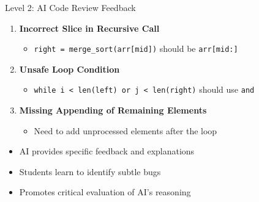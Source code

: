 \documentclass{beamer}
\begin{document}
\begin{frame}{Level 2: AI Code Review Feedback}
    \begin{tcolorbox}[colback=myred!5,colframe=myred,title=AI-Identified Issues]
        \begin{enumerate}
            \item \textbf{Incorrect Slice in Recursive Call}
                \begin{itemize}
                    \item \texttt{right = merge\_sort(arr[mid])} should be \texttt{arr[mid:]}
                \end{itemize}
                
            \item \textbf{Unsafe Loop Condition}
                \begin{itemize}
                    \item \texttt{while i < len(left) or j < len(right)} should use \texttt{and}
                \end{itemize}
                
            \item \textbf{Missing Appending of Remaining Elements}
                \begin{itemize}
                    \item Need to add unprocessed elements after the loop
                \end{itemize}
        \end{enumerate}
    \end{tcolorbox}
    
    \begin{itemize}
        \item AI provides specific feedback and explanations
        \item Students learn to identify subtle bugs
        \item Promotes critical evaluation of AI's reasoning
    \end{itemize}
\end{frame}
\end{document}
